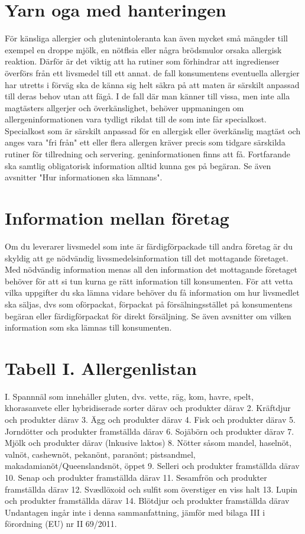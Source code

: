 \section*{Yarn oga med hanteringen}
För känsliga allergier och glutenintoleranta kan även mycket små mängder till exempel en droppe mjölk, en nötflsia eller några brödsmulor orsaka allergisk reaktion. Därför är det viktig att ha rutiner som förhindrar att ingredienser överförs från ett livsmedel till ett annat.
de fall konsumentens eventuella allergier har utretts i förväg ska de känna sig helt säkra på att maten är särskilt anpassad till deras behov utan att fägå. I de fall där man känner till vissa, men inte alla magtästers allgerjer och överkänslighet, behöver uppmaningen om allergeninformationen vara tydligt rikdat till de som inte får specialkost. Specialkost som är särskilt anpassad för en allergisk eller överkänslig magtäst och anges vara "fri från" ett eller flera allergen kräver precis som tidgare särskilda rutiner för tillredning och servering.
geninformationen finns att få. Fortfarande ska samtlig obligatorisk information alltid kunna ges på begäran. Se även avsnitter "Hur informationen ska lämnans".
\section*{Information mellan företag}
Om du leverarer livsmedel som inte är färdigförpackade till andra företag är du skyldig att ge nödvändig livssmedelsinformation till det mottagande företaget. Med nödvändig information menas all den information det mottagande företaget behöver för att si tun kurna ge rätt information till konsumenten. För att vetta vilka uppgifter du ska lämna vidare behöver du få information om hur livsmedlet ska säljas, dvs som oförpackat, förpackat på försälningsstället på konsumentens begäran eller färdigförpackat för direkt försäljning.
Se även avsnitter om vilken information som ska lämnas till konsumenten.
\section*{Tabell I. Allergenlistan}
I. Spannnäl som innehåller gluten, dvs. vette, räg, kom, havre, spelt, khorasanvete eller hybridiserade sorter därav och produkter därav
2. Kräftdjur och produkter därav
3. Ägg och produkter därav
4. Fisk och produkter därav
5. Jorndötter och produkter framställda därav
6. Sojäbörn och produkter därav
7. Mjölk och produkter därav (lnkusive laktos)
8. Nötter såsom mandel, haselnöt, valnöt, cashewnöt, pekanönt, paranönt; pistsandmel, makadamianöt/Queenslandsnöt, öppet
9. Selleri och produkter framställda därav
10. Senap och produkter framställda därav
11. Sesamfrön och produkter framställda därav
12. Svædlöxoid och sulfit som överstiger en viss halt
13. Lupin och produkter framställda därav
14. Blötdjur och produkter framställda därav
Undantagen ingår inte i denna sammanfattning, jämför med bilaga
III i förordning (EU) nr II 69/2011.

